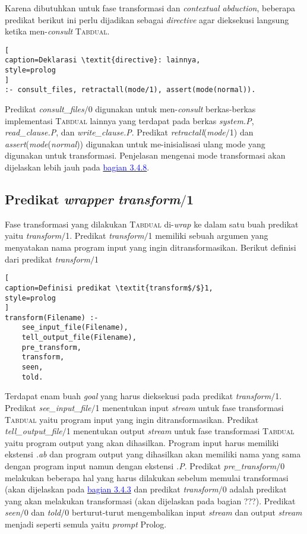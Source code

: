 Karena dibutuhkan untuk fase transformasi dan \textit{contextual abduction}, beberapa predikat berikut ini perlu dijadikan sebagai \textit{directive} agar dieksekusi langsung ketika men-\textit{consult} \textsc{Tabdual}.
\\

\begin{lstlisting}[
caption=Deklarasi \textit{directive}: lainnya,
style=prolog
]
:- consult_files, retractall(mode/1), assert(mode(normal)).
\end{lstlisting}

Predikat \textit{consult\_files$/$}0 digunakan untuk men-\textit{consult} berkas-berkas implementasi \textsc{Tabdual} lainnya yang terdapat pada berkas \textit{system.P}, \textit{read\_clause.P}, dan \textit{write\_clause.P}. Predikat \textit{retractall}(\textit{mode$/$}1) dan \textit{assert}(\textit{mode}(\textit{normal})) digunakan untuk me-inisialisasi ulang mode yang digunakan untuk transformasi. Penjelasan mengenai mode transformasi akan dijelaskan lebih jauh pada \hyperref[subsec:mode]{\textcolor{blue}{bagian 3.4.8}}.

\subsection{Predikat \textit{wrapper} \textit{transform$/$}1}

Fase transformasi yang dilakukan \textsc{Tabdual} di-\textit{wrap} ke dalam satu buah predikat yaitu \textit{transform$/$}1. Predikat \textit{transform$/$}1 memiliki sebuah argumen yang menyatakan nama program input yang ingin ditransformasikan. Berikut definisi dari predikat \textit{transform$/$}1
\\

\begin{lstlisting}[
caption=Definisi predikat \textit{transform$/$}1,
style=prolog
]
transform(Filename) :-
	see_input_file(Filename),
	tell_output_file(Filename),
	pre_transform,
	transform,
	seen,
	told.
\end{lstlisting}

Terdapat enam buah \textit{goal} yang harus dieksekusi pada predikat \textit{transform$/$}1. Predikat \textit{see\_input\_file$/$}1 menentukan input \textit{stream} untuk fase transformasi \textsc{Tabdual} yaitu program input yang ingin ditransformasikan. Predikat \textit{tell\_output\_file$/$}1 menentukan output \textit{stream} untuk fase transformasi \textsc{Tabdual} yaitu program output yang akan dihasilkan. Program input harus memiliki ekstensi \textit{.ab} dan program output yang dihasilkan akan memiliki nama yang sama dengan program input namun dengan ekstensi \textit{.P}. Predikat \textit{pre\_transform$/$}0 melakukan beberapa hal yang harus dilakukan sebelum memulai transformasi (akan dijelaskan pada \hyperref[subsec:pre_transform]{\textcolor{blue}{bagian 3.4.3}} dan predikat \textit{transform$/$}0 adalah predikat yang akan melakukan transformasi (akan dijelaskan pada bagian ???). Predikat \textit{seen$/$}0 dan \textit{told$/$}0 berturut-turut mengembalikan input \textit{stream} dan output \textit{stream} menjadi seperti semula yaitu \textit{prompt} Prolog.

